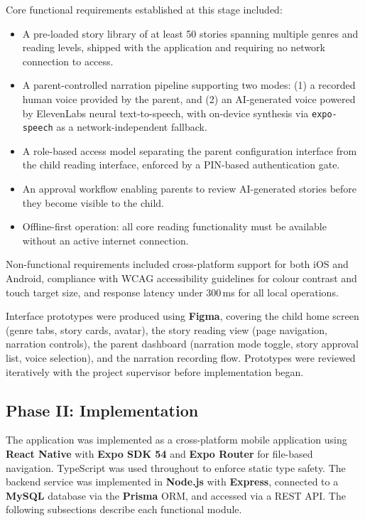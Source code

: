 Core functional requirements established at this stage included:
\begin{itemize}
    \item A pre-loaded story library of at least 50 stories spanning multiple genres and reading levels, shipped with the application and requiring no network connection to access.
    \item A parent-controlled narration pipeline supporting two modes: (1) a recorded human voice provided by the parent, and (2) an AI-generated voice powered by ElevenLabs neural text-to-speech, with on-device synthesis via \texttt{expo-speech} as a network-independent fallback.
    \item A role-based access model separating the parent configuration interface from the child reading interface, enforced by a PIN-based authentication gate.
    \item An approval workflow enabling parents to review AI-generated stories before they become visible to the child.
    \item Offline-first operation: all core reading functionality must be available without an active internet connection.
\end{itemize}

Non-functional requirements included cross-platform support for both iOS and Android, compliance with WCAG accessibility guidelines for colour contrast and touch target size, and response latency under 300\,ms for all local operations.

Interface prototypes were produced using \textbf{Figma}, covering the child home screen (genre tabs, story cards, avatar), the story reading view (page navigation, narration controls), the parent dashboard (narration mode toggle, story approval list, voice selection), and the narration recording flow. Prototypes were reviewed iteratively with the project supervisor before implementation began.

\subsection{Phase II: Implementation}

The application was implemented as a cross-platform mobile application using \textbf{React Native} with \textbf{Expo SDK 54} and \textbf{Expo Router} for file-based navigation. TypeScript was used throughout to enforce static type safety. The backend service was implemented in \textbf{Node.js} with \textbf{Express}, connected to a \textbf{MySQL} database via the \textbf{Prisma} ORM, and accessed via a REST API. The following subsections describe each functional module.

